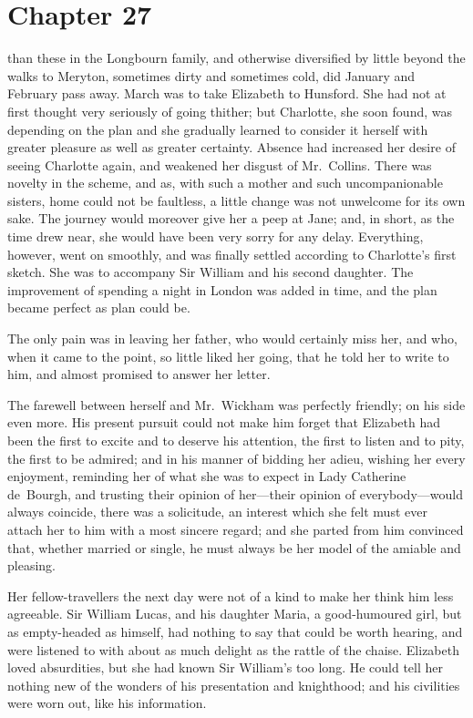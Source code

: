 \chapter{Chapter 27}


 than these in the Longbourn family, and
otherwise diversified by little beyond the walks to Meryton,
sometimes dirty and sometimes cold, did January and February
pass away.  March was to take Elizabeth to Hunsford.  She had
not at first thought very seriously of going thither; but Charlotte,
she soon found, was depending on the plan and she gradually
learned to consider it herself with greater pleasure as well as
greater certainty.  Absence had increased her desire of seeing
Charlotte again, and weakened her disgust of Mr.\ Collins.  There
was novelty in the scheme, and as, with such a mother and such
uncompanionable sisters, home could not be faultless, a little
change was not unwelcome for its own sake.  The journey
would moreover give her a peep at Jane; and, in short, as the
time drew near, she would have been very sorry for any delay.
Everything, however, went on smoothly, and was finally settled
according to Charlotte's first sketch.  She was to accompany Sir
William and his second daughter.  The improvement of spending
a night in London was added in time, and the plan became
perfect as plan could be.

The only pain was in leaving her father, who would certainly
miss her, and who, when it came to the point, so little liked her
going, that he told her to write to him, and almost promised to
answer her letter.

The farewell between herself and Mr.\ Wickham was perfectly
friendly; on his side even more.  His present pursuit could not
make him forget that Elizabeth had been the first to excite and to
deserve his attention, the first to listen and to pity, the first
to be admired; and in his manner of bidding her adieu, wishing
her every enjoyment, reminding her of what she was to expect in
Lady Catherine de~Bourgh, and trusting their opinion of her---their
opinion of everybody---would always coincide, there was a solicitude,
an interest which she felt must ever attach her to him with a most
sincere regard; and she parted from him convinced that, whether
married or single, he must always be her model of the amiable and
pleasing.

Her fellow-travellers the next day were not of a kind to make her
think him less agreeable.  Sir William Lucas, and his daughter
Maria, a good-humoured girl, but as empty-headed as himself,
had nothing to say that could be worth hearing, and were
listened to with about as much delight as the rattle of the chaise.
Elizabeth loved absurdities, but she had known Sir William's too
long.  He could tell her nothing new of the wonders of his
presentation and knighthood; and his civilities were worn out,
like his information.

